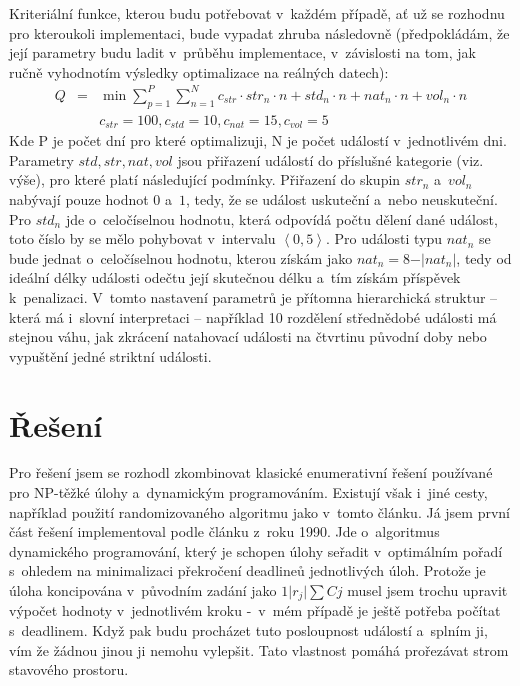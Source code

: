\documentclass[a4paper,11pt]{article}
\begin{document}
Kriteriální funkce, kterou budu potřebovat v~každém případě, ať už se rozhodnu pro kteroukoli implementaci, bude vypadat zhruba následovně (předpokládám, že její parametry budu ladit v~průběhu implementace, v~závislosti na tom, jak ručně vyhodnotím výsledky optimalizace na reálných datech):
\begin{eqnarray*}
Q &=& \min \sum_{p=1}^P \sum_{n=1}^N c_{str} \cdot str_n \cdot n + std_n \cdot n + nat_n \cdot n + vol_n \cdot n\\
&&c_{str} = 100, c_{std} = 10, c_{nat} = 15, c_{vol} = 5
\end{eqnarray*}
Kde P je počet dní pro které optimalizuji, N je počet událostí v~jednotlivém dni. Parametry $std,str,nat,$\linebreak $vol$  jsou přiřazení událostí do příslušné kategorie (viz. výše), pro které platí následující podmínky.
Přiřazení do skupin $str_n$ a~$vol_n$ nabývají pouze hodnot $0$ a~$1$, tedy, že se událost uskuteční a~nebo neuskuteční. Pro $std_n$ jde o~celočíselnou hodnotu, která odpovídá počtu dělení dané událost, toto číslo by se mělo pohybovat v~intervalu $\left\langle 0,5 \right\rangle$. Pro události typu $nat_n$ se bude jednat o~celočíselnou hodnotu, kterou získám jako $nat_n = 8 - \vert nat_n \vert$, tedy od ideální délky události odečtu její skutečnou délku a~tím získám příspěvek k~penalizaci. V~tomto nastavení parametrů je přítomna hierarchická struktur -- která má i~slovní interpretaci -- například 10 rozdělení střednědobé události má stejnou váhu, jak zkrácení natahovací události na čtvrtinu původní doby nebo vypuštění jedné striktní události.

\section*{Řešení}
Pro řešení jsem se rozhodl zkombinovat klasické enumerativní řešení používané pro NP-těžké úlohy a~dynamickým programováním. Existují však i~jiné cesty, například použití randomizovaného algoritmu jako v~tomto článku\cite{goemans2002single}. Já jsem první část řešení implementoval podle článku\cite{Cheng1990} z~roku 1990. Jde o~algoritmus dynamického programování, který je schopen úlohy seřadit v~optimálním pořadí s~ohledem na minimalizaci překročení deadlineů jednotlivých úloh. Protože je úloha koncipována v~původním zadání jako $1\vert r_j \vert \sum Cj$ musel jsem trochu upravit výpočet hodnoty v~jednotlivém kroku -~v~mém případě je ještě potřeba počítat s~deadlinem. Když pak budu procházet tuto posloupnost událostí a~splním ji, vím že žádnou jinou ji nemohu vylepšit. Tato vlastnost pomáhá  prořezávat strom stavového prostoru.
\end{document}
